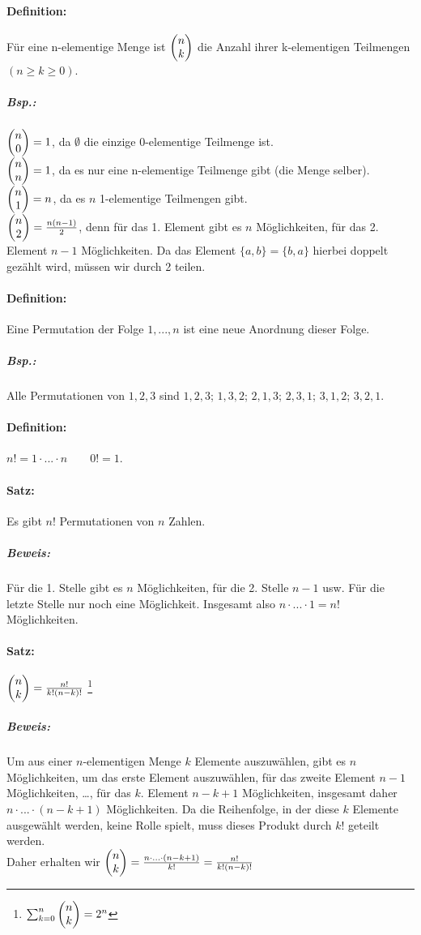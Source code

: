 \paragraph{Definition:} Für eine n-elementige Menge ist $\begin{pmatrix}n\\k\end{pmatrix}$ die Anzahl ihrer k-elementigen Teilmengen $(n\geq k \geq 0)$.

\subparagraph{Bsp.:} \parskp
$\begin{pmatrix}n\\0\end{pmatrix}=1$, da $\emptyset$ die einzige 0-elementige Teilmenge ist.\\
$\begin{pmatrix}n\\n\end{pmatrix}=1$, da es nur eine n-elementige Teilmenge gibt (die Menge selber).\\
$\begin{pmatrix}n\\1\end{pmatrix}=n$, da es $n$ 1-elementige Teilmengen gibt.\\
$\begin{pmatrix}n\\2\end{pmatrix}=\frac{n(n-1)}{2}$, denn für das 1. Element gibt es $n$ Möglichkeiten, für das 2. Element $n-1$ Möglichkeiten. Da das Element $\{a,b\}=\{b,a\}$ hierbei doppelt gezählt wird, müssen wir durch 2 teilen.

\paragraph{Definition:} Eine Permutation der Folge $1,...,n$ ist eine neue Anordnung dieser Folge.

\subparagraph{Bsp.:} Alle Permutationen von $1,2,3$ sind $1,2,3$; $1,3,2$; $2,1,3$; $2,3,1$; $3,1,2$; $3,2,1$.

\paragraph{Definition:} $n!=1\cdot ... \cdot n \qquad 0! =1$.
\paragraph{Satz:} Es gibt $n!$ Permutationen von $n$ Zahlen.

\subparagraph{Beweis:} Für die 1. Stelle gibt es $n$ Möglichkeiten, für die 2. Stelle $n-1$ usw. Für die letzte Stelle nur noch eine Möglichkeit. Insgesamt also $n\cdot ... \cdot 1=n!$ Möglichkeiten.

\paragraph{Satz:} $\begin{pmatrix}n\\k\end{pmatrix}= \frac{n!}{k! (n-k)!}$ \footnote{$\sum_{k=0}^{n}\begin{pmatrix}n\\k\end{pmatrix}=2^n$}
\subparagraph{Beweis:} Um aus einer $n$-elementigen Menge $k$ Elemente auszuwählen, gibt es $n$ Möglichkeiten, um das erste Element auszuwählen, für das zweite Element $n-1$ Möglichkeiten, …, für das $k$. Element $n-k+1$ Möglichkeiten, insgesamt daher $n \cdot ...\cdot (n-k+1)$ Möglichkeiten. Da die Reihenfolge, in der diese $k$ Elemente ausgewählt werden, keine Rolle spielt, muss dieses Produkt durch $k!$ geteilt werden. \\
Daher erhalten wir $\begin{pmatrix}n\\k\end{pmatrix}= \frac{n\cdot ...\cdot (n-k+1)}{k!}= \frac{n!}{k! (n-k)!}$

